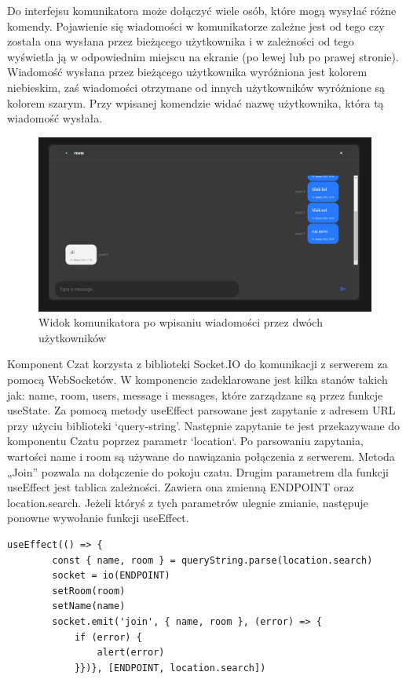 Do interfejsu komunikatora może dołączyć wiele osób, które mogą wysyłać różne komendy. Pojawienie się wiadomości w komunikatorze zależne jest od tego czy została ona wysłana przez bieżącego użytkownika i w zależności od tego wyświetla ją w odpowiednim miejscu na ekranie (po lewej lub po prawej stronie). Wiadomość wysłana przez bieżącego użytkownika wyróżniona jest kolorem niebieskim, zaś wiadomości otrzymane od innych użytkowników wyróżnione są kolorem szarym. Przy wpisanej komendzie widać nazwę użytkownika, która tą wiadomość wysłała.
\begin{figure}
	\centering
	\includegraphics[width=0.5\linewidth]{"obrazy/interface2..2"}
	\caption{Widok komunikatora po wpisaniu wiadomości przez dwóch użytkowników}
	\label{fig:13}
\end{figure}
Komponent Czat korzysta z biblioteki Socket.IO do komunikacji z serwerem za pomocą WebSocketów. W komponencie zadeklarowane jest kilka stanów takich jak: name, room, users, message i messages, które zarządzane są przez funkcje useState. Za pomocą metody useEffect parsowane jest zapytanie z adresem URL przy użyciu biblioteki ‘query-string’. Następnie zapytanie te jest przekazywane do komponentu Czatu poprzez parametr `location`. Po parsowaniu zapytania, wartości name i room są używane do nawiązania połączenia z serwerem. Metoda „Join” pozwala na dołączenie do pokoju czatu. Drugim parametrem dla funkcji useEffect jest tablica zależności. Zawiera ona zmienną ENDPOINT oraz location.search. Jeżeli któryś z tych parametrów ulegnie zmianie, następuje ponowne wywołanie funkcji useEffect. 
\begin{lstlisting}[caption=Implementacja funkcji dołączenia do komunikatora po stronie klienta]
useEffect(() => {
        const { name, room } = queryString.parse(location.search)
        socket = io(ENDPOINT)
        setRoom(room)
        setName(name)
        socket.emit('join', { name, room }, (error) => {
            if (error) {
                alert(error)
            }})}, [ENDPOINT, location.search])
\end{lstlisting}

